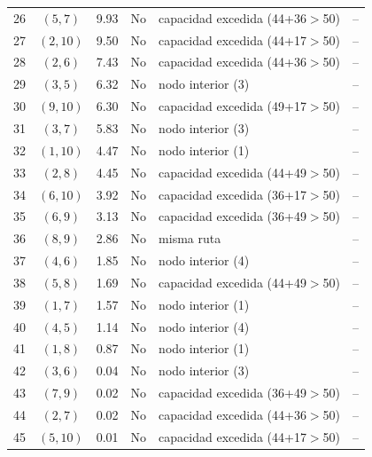 \begin{tabular}{ccrcll}
26 & $(5,7)$ & 9.93 & No & capacidad excedida (44+36$>$50) & -- \\
27 & $(2,10)$ & 9.50 & No & capacidad excedida (44+17$>$50) & -- \\
28 & $(2,6)$ & 7.43 & No & capacidad excedida (44+36$>$50) & -- \\
29 & $(3,5)$ & 6.32 & No & nodo interior (3) & -- \\
30 & $(9,10)$ & 6.30 & No & capacidad excedida (49+17$>$50) & -- \\
31 & $(3,7)$ & 5.83 & No & nodo interior (3) & -- \\
32 & $(1,10)$ & 4.47 & No & nodo interior (1) & -- \\
33 & $(2,8)$ & 4.45 & No & capacidad excedida (44+49$>$50) & -- \\
34 & $(6,10)$ & 3.92 & No & capacidad excedida (36+17$>$50) & -- \\
35 & $(6,9)$ & 3.13 & No & capacidad excedida (36+49$>$50) & -- \\
36 & $(8,9)$ & 2.86 & No & misma ruta & -- \\
37 & $(4,6)$ & 1.85 & No & nodo interior (4) & -- \\
38 & $(5,8)$ & 1.69 & No & capacidad excedida (44+49$>$50) & -- \\
39 & $(1,7)$ & 1.57 & No & nodo interior (1) & -- \\
40 & $(4,5)$ & 1.14 & No & nodo interior (4) & -- \\
41 & $(1,8)$ & 0.87 & No & nodo interior (1) & -- \\
42 & $(3,6)$ & 0.04 & No & nodo interior (3) & -- \\
43 & $(7,9)$ & 0.02 & No & capacidad excedida (36+49$>$50) & -- \\
44 & $(2,7)$ & 0.02 & No & capacidad excedida (44+36$>$50) & -- \\
45 & $(5,10)$ & 0.01 & No & capacidad excedida (44+17$>$50) & -- \\
\bottomrule
\end{tabular}
